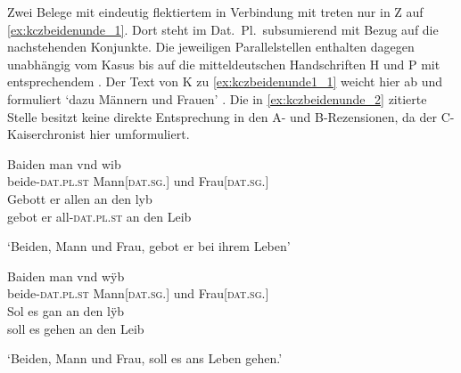 Zwei Belege mit eindeutig flektiertem  in Verbindung mit
 treten nur in Z auf \cref{ex:kczbeidenunde_1}. Dort
steht  im Dat.\ Pl.\ subsumierend mit Bezug auf die nachstehenden
Konjunkte. Die jeweiligen Parallelstellen enthalten dagegen unabhängig vom
Kasus  bis auf die mitteldeutschen Handschriften H und
P mit entsprechendem . Der Text von K zu
\cref{ex:kczbeidenunde1_1} weicht hier ab und formuliert
 `dazu Männern und Frauen'
\autocite[\pno~3va,22]{kc:K}. Die in \cref{ex:kczbeidenunde_2} zitierte Stelle
besitzt keine direkte Entsprechung in den A- und B-Rezensionen, da der
C-Kaiserchronist hier umformuliert.

\begin{exe}
\ex \label{ex:kczbeidenunde_1}
	\begin{xlist}
	\ex \label{ex:kczbeidenunde1_1}
		\gll Baiden man vnd wib \\
			beide-\textsc{dat.pl\subMF.st} Mann[\textsc{dat.sg.\MascM}] und
				Frau[\textsc{dat.sg.\NeutF}] \\
	\sn \gll Gebott er allen an den lyb \\
			gebot er all-\textsc{dat.pl\subMF.st} an den Leib \\
		\begin{taggedline}{%
			\parencites[\pno~10va,9--10]{kc:Z}[vgl.]%
			[\pno~3va,19--20]{kc:C1}%
			[\pno~3va,22--23]{kc:K}%
			[abweichend][\pno~3va,1--2]{kc:A1}%
			[\pno~5va,16--17]{kc:M}%
			[\pno~3vb,10--12]{kc:H}%
			[\pno~3vc,51--53]{kc:B1}%
			[\pno~3vb,5--7]{kc:VB}%
			[\pno~6ra,8--10]{kc:P}%
			[619--621]{schroeder1895}}
		\trans `Beiden, Mann und Frau, gebot er bei ihrem Leben'
		\end{taggedline}

	\ex \label{ex:kczbeidenunde_2}
		\gll Baiden man vnd wÿb \\
			beide-\textsc{dat.pl\subMF.st} Mann[\textsc{dat.sg.\MascM}] und
				Frau[\textsc{dat.sg.\NeutF}] \\
	\sn \gll Sol es gan an den lÿb \\
			soll es gehen an den Leib \\
		\begin{taggedline}{%
			\parencites[\pno~15ra,18--19]{kc:Z}[vgl.]%
			[\pno~4vb,2]{kc:C1}%
			[\pno~4vb,33--34]{kc:K}%
			[zu][846--849]{schroeder1895}}
		\trans `Beiden, Mann und Frau, soll es ans Leben gehen.'
		\end{taggedline}
\end{xlist}
\end{exe}

